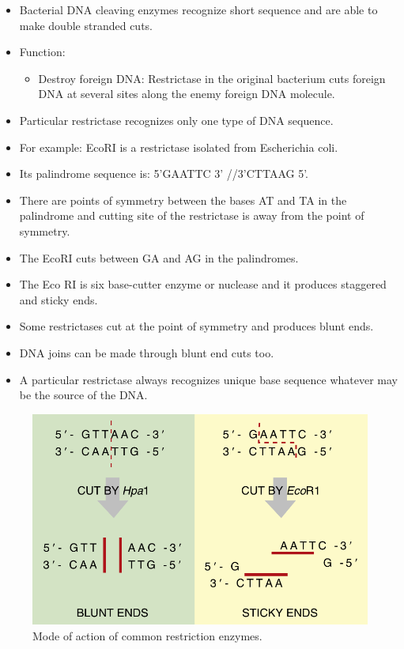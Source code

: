 \documentclass[11pt,dvipsnames,ignorenonframetext,aspectratio=169]{beamer}
\providecommand{\tightlist}{%
  \setlength{\itemsep}{0pt}\setlength{\parskip}{0pt}}
\begin{document}
\begin{frame}{}
\protect\hypertarget{section-10}{}
\begin{itemize}
\tightlist
\item
  Bacterial DNA cleaving enzymes recognize short sequence and are able
  to make double stranded cuts.
\item
  Function:

  \begin{itemize}
  \tightlist
  \item
    Destroy foreign DNA: Restrictase in the original bacterium cuts
    foreign DNA at several sites along the enemy foreign DNA molecule.
  \end{itemize}
\item
  Particular restrictase recognizes only one type of DNA sequence.
\item
  For example: EcoRI is a restrictase isolated from Escherichia coli.
\item
  Its palindrome sequence is: 5'GAATTC 3' //3'CTTAAG 5'.
\end{itemize}
\end{frame}

\begin{frame}{}
\protect\hypertarget{section-11}{}
\begin{itemize}
\tightlist
\item
  There are points of symmetry between the bases AT and TA in the
  palindrome and cutting site of the restrictase is away from the point
  of symmetry.
\item
  The EcoRI cuts between GA and AG in the palindromes.
\item
  The Eco RI is six base-cutter enzyme or nuclease and it produces
  staggered and sticky ends.
\item
  Some restrictases cut at the point of symmetry and produces blunt
  ends.
\item
  DNA joins can be made through blunt end cuts too.
\item
  A particular restrictase always recognizes unique base sequence
  whatever may be the source of the DNA.
\end{itemize}
\end{frame}

\begin{frame}{}
\protect\hypertarget{section-12}{}
\begin{figure}
\includegraphics[width=0.55\linewidth]{./../images/restriction_enzymes} \caption{Mode of action of common restriction enzymes.}\label{fig:restriction-enzymes}
\end{figure}
\end{frame}
\end{document}
